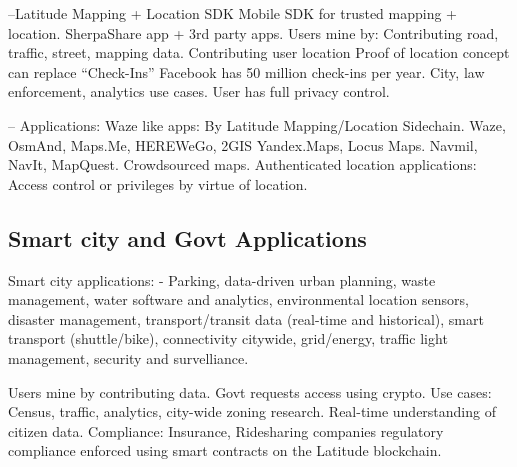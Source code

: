 --Latitude Mapping + Location SDK
Mobile SDK for trusted mapping + location.
SherpaShare app + 3rd party apps.
Users mine by:
Contributing road, traffic, street, mapping data.
Contributing user location
Proof of location concept can replace “Check-Ins”
Facebook has 50 million check-ins per year.
City, law enforcement, analytics use cases.
User has full privacy control.

-- Applications:
Waze like apps:
By Latitude Mapping/Location Sidechain.
Waze, OsmAnd, Maps.Me, HEREWeGo, 2GIS
Yandex.Maps, Locus Maps.
 Navmil, NavIt, MapQuest.
 Crowdsourced maps.
 Authenticated location applications:
 Access control or privileges by virtue of location.

\subsection{Smart city and Govt Applications}

Smart city applications:
 - Parking, data-driven urban planning, waste management, water software and analytics, environmental location sensors,
   disaster management, transport/transit data (real-time and historical), smart transport (shuttle/bike),
   connectivity citywide, grid/energy, traffic light management, security and survelliance.

  Users mine by contributing data.
  Govt requests access using crypto.
  Use cases:
  Census, traffic, analytics, city-wide zoning research.
  Real-time understanding of citizen data.
  Compliance:
  Insurance, Ridesharing companies regulatory compliance enforced using smart contracts on the Latitude blockchain.
